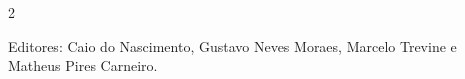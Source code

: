 \documentclass[11pt,a4paper]{article}
\begin{document}
\sloppy

\newcommand{\edicaoMes}{SETEMBRO}
\newcommand{\edicaoAno}{2026}





\begin{multicols}{2}




%




{\color{gray}
Editores:
Caio do Nascimento, Gustavo Neves Moraes, Marcelo Trevine e Matheus Pires Carneiro.
}

\end{multicols}
\end{document}
